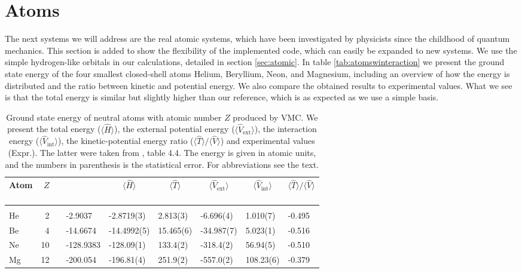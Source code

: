 \newpage
\section{Atoms}\label{sec:atomsresults}
The next systems we will address are the real atomic systems, which have been investigated by physicists since the childhood of quantum mechanics. This section is added to show the flexibility of the implemented code, which can easily be expanded to new systems. We use the simple hydrogen-like orbitals in our calculations, detailed in section \ref{sec:atomic}. In table \eqref{tab:atomswinteraction} we present the ground state energy of the four smallest closed-shell atoms Helium, Beryllium, Neon, and Magnesium, including an overview of how the energy is distributed and the ratio between kinetic and potential energy. We also compare the obtained results to experimental values. What we see is that the total energy is similar but slightly higher than our reference, which is as expected as we use a simple basis.

\begin{table}[H]
	\caption{Ground state energy of neutral atoms with atomic number $Z$ produced by VMC. We present the total energy ($\langle\hat{H}\rangle$), the external potential energy ($\langle\hat{V}_{\text{ext}}\rangle$), the interaction energy ($\langle\hat{V}_{\text{int}}\rangle$), the kinetic-potential energy ratio ($\langle\hat{T}\rangle/\langle\hat{V}\rangle$) and experimental values (Expr.). The latter were taken from \citet{degroote_faddeev_2013}, table 4.4. The energy is given in atomic units, and the numbers in parenthesis is the statistical error. For abbreviations see the text.}
	\label{tab:atomswinteraction}
	\begin{tabularx}{\textwidth}{lrrR{2cm}R{1.9cm}|R{1.7cm}R{1.7cm}R{1.7cm}R{1.7cm}} \hline\hline
		Atom & $Z$ & \makecell{\\ \phantom{=} \\ \phantom{=}} & 
		 &  &  &  &  &  \\ \hline \\
		
		He & 2 && -2.9037 & -2.8719(3) & 2.813(3) & -6.696(4) & 1.010(7) & -0.495 \\
		Be & 4 && -14.6674 & -14.4992(5) & 15.465(6) & -34.987(7) & 5.023(1) & -0.516 \\
		Ne & 10 && -128.9383 & -128.09(1) & 133.4(2) & -318.4(2) & 56.94(5) & -0.510 \\ 
		Mg & 12 && -200.054 & -196.81(4) & 251.9(2) & -557.0(2) & 108.23(6) & -0.379 \\ \hline\hline
	\end{tabularx}
\end{table}

